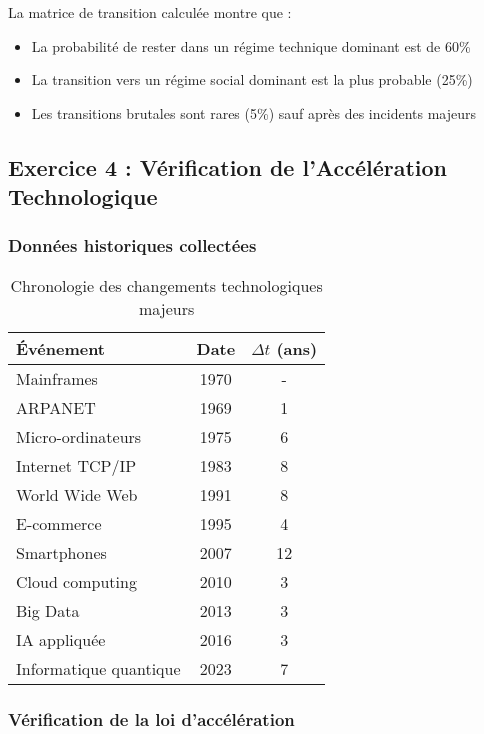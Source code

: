 \documentclass[12pt,a4paper]{article}
\begin{document}
La matrice de transition calculée montre que :
\begin{itemize}
\item La probabilité de rester dans un régime technique dominant est de 60\%
\item La transition vers un régime social dominant est la plus probable (25\%)
\item Les transitions brutales sont rares (5\%) sauf après des incidents majeurs
\end{itemize}

\subsection{Exercice 4 : Vérification de l'Accélération Technologique}

\subsubsection{Données historiques collectées}

\begin{table}[H]
\centering
\begin{tabular}{|l|c|c|}
\hline
\textbf{Événement} & \textbf{Date} & $\Delta t$ (ans) \\
\hline
Mainframes & 1970 & - \\
ARPANET & 1969 & 1 \\
Micro-ordinateurs & 1975 & 6 \\
Internet TCP/IP & 1983 & 8 \\
World Wide Web & 1991 & 8 \\
E-commerce & 1995 & 4 \\
Smartphones & 2007 & 12 \\
Cloud computing & 2010 & 3 \\
Big Data & 2013 & 3 \\
IA appliquée & 2016 & 3 \\
Informatique quantique & 2023 & 7 \\
\hline
\end{tabular}
\caption{Chronologie des changements technologiques majeurs}
\end{table}

\subsubsection{Vérification de la loi d'accélération}
\end{document}

